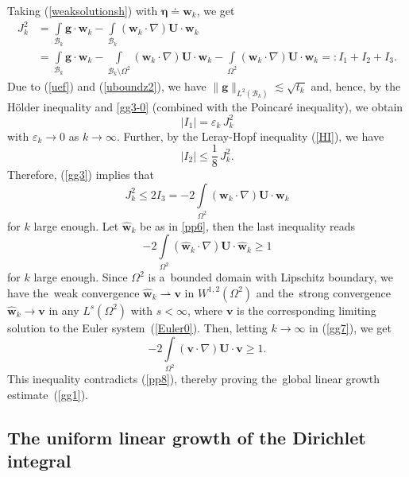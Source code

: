 \documentclass[11pt]{article}
\numberwithin{equation}{section}
\numberwithin{figure}{section}
\def\ve{{\mathbf v}}
\def\we{{\mathbf w}}
\def\e{{\varepsilon}}
\begin{document}
Taking (\ref{weaksolutionsh}) with $\boldsymbol{\eta}\doteq\we_k$, we get
\begin{align}
	J_k^2&= \int\limits_{  \mathcal{B}_k}\mathbf{g}\cdot\we_k-\int\limits_{  \mathcal{B}_k}(\mathbf{w}_k \cdot \nabla) \mathbf{U}\cdot\we_k  \nonumber \\[4pt]
	&=\int\limits_{  \mathcal{B}_k}\mathbf{g}\cdot\we_k-\int\limits_{  \mathcal{B}_k\setminus\Omega^2}(\mathbf{w}_k \cdot \nabla) \mathbf{U}\cdot\we_k-\int\limits_{\Omega^2}(\mathbf{w}_k \cdot \nabla) \mathbf{U}\cdot\we_k=: I_1+I_2+I_3.\label{gg3}
\end{align}
Due to (\ref{uef}) and (\ref{uboundz2}), we have $\|\mathbf{g}\|_{L^2(  \mathcal{B}_k)}\lesssim \sqrt{t_k}$ and, hence,
by the H\"older inequality and \eqref{gg3-0} (combined with the Poincaré inequality), we obtain
\begin{equation}\label{gg4}
|I_1|=\e_k\, J_k^2
\end{equation}
with $\e_k\to0$ as $k\to\infty$. Further, by the Leray-Hopf inequality (\ref{HI}), we have
\begin{equation}\label{gg5}
|I_2|\le\frac18\,{J_k^2}.
\end{equation}
Therefore, (\ref{gg3}) implies that
$$
{J_k^2}\le 2 I_3=-2\int\limits_{\Omega^2}(\mathbf{w}_k \cdot \nabla) \mathbf{U}\cdot\we_k
$$
for $k$ large enough. Let $\widehat\we_k$ be as in \eqref{pp6}, then the last inequality reads
\begin{equation}\label{gg7}-2\int\limits_{\Omega^2}(\widehat\we_k \cdot \nabla) \mathbf{U}\cdot\widehat\we_k\ge1
\end{equation}
for $k$ large enough.
Since $\Omega^2$ is a~bounded domain with Lipschitz boundary, we have the~weak convergence $\widehat\we_k\rightharpoonup\ve$ in $W^{1,2}(\Omega^2)$ and the~strong convergence
$\widehat\we_k\to\ve$ in any $L^s(\Omega^2)$ with $s<\infty$, where $\ve$ is the corresponding limiting solution to the Euler system~(\ref{Euler0}). Then, letting $k\to\infty$ in (\ref{gg7}), we get
\begin{equation}\label{gg8}-2\int\limits_{\Omega^2}(\ve \cdot \nabla) \mathbf{U}\cdot\ve\ge 1.
\end{equation}
This inequality contradicts (\ref{pp8}), thereby proving the~global linear growth estimate~(\ref{gg1}).

\subsection{The uniform linear growth of the Dirichlet integral}\label{poet6}
\end{document}
